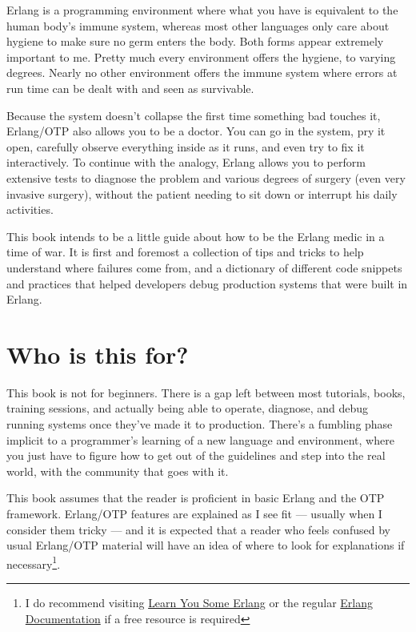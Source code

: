 \documentclass[11pt, oneside]{book}   	%
\begin{document}
Erlang is a programming environment where what you have is equivalent to the human body's immune system, whereas most other languages only care about hygiene to make sure no germ enters the body. Both forms appear extremely important to me. Pretty much every environment offers the hygiene, to varying degrees. Nearly no other environment offers the immune system where errors at run time can be dealt with and seen as survivable.

Because the system doesn't collapse the first time something bad touches it, Erlang/OTP also allows you to be a doctor. You can go in the system, pry it open, carefully observe everything inside as it runs, and even try to fix it interactively. To continue with the analogy, Erlang allows you to perform extensive tests to diagnose the problem and various degrees of surgery (even very invasive surgery), without the patient needing to sit down or interrupt his daily activities.

This book intends to be a little guide about how to be the Erlang medic in a time of war. It is first and foremost a collection of tips and tricks to help understand where failures come from, and a dictionary of different code snippets and practices that helped developers debug production systems that were built in Erlang.

\section{Who is this for?}
\label{sec:who-is-this-for}

This book is not for beginners. There is a gap left between most tutorials, books, training sessions, and actually being able to operate, diagnose, and debug running systems once they've made it to production. There's a fumbling phase implicit to a programmer's learning of a new language and environment, where you just have to figure how to get out of the guidelines and step into the real world, with the community that goes with it.

This book assumes that the reader is proficient in basic Erlang and the OTP framework. Erlang/OTP features are explained as I see fit — usually when I consider them tricky — and it is expected that a reader who feels confused by usual Erlang/OTP material will have an idea of where to look for explanations if necessary\footnote{I do recommend visiting \href{http://learnyousomeerlang.com}{Learn You Some Erlang} or the regular \href{http://www.erlang.org/erldoc}{Erlang Documentation} if a free resource is required}.
\end{document}
